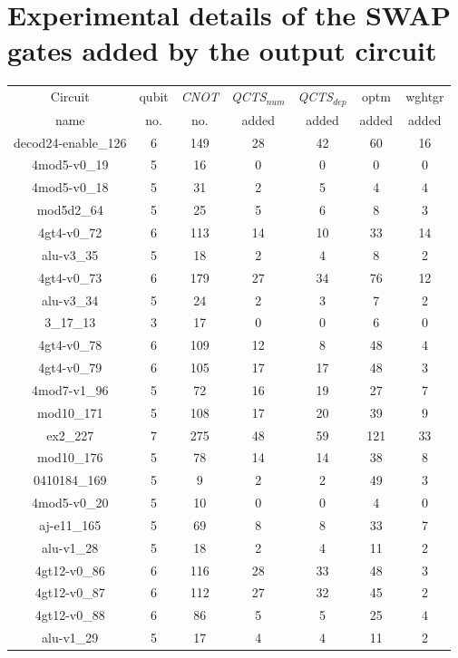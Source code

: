\documentclass[runningheads]{llncs}
\begin{document}
\section{Experimental details of the SWAP gates added by the output circuit}
\begin{table}[H]
	\begin{center}  
	\begin{tabular}{|c|c|c|c|c|c|c|}
	\hline
	Circuit &  qubit  & \textit{CNOT} &\textit{QCTS$_{num}$}& \textit{QCTS$_{dep}$}  & optm 	 & wghtgr 	\\
	 name	&   no. 	&	no. & added&  added &  added 	&  added\\
	\hline
	decod24-enable\_126 & 6 & 149 & 28 & 42 & 60 & 16 \\ 
4mod5-v0\_19 & 5 & 16 & 0 & 0 & 0 & 0 \\ 
4mod5-v0\_18 & 5 & 31 & 2 & 5 & 4 & 4 \\ 
mod5d2\_64 & 5 & 25 & 5 & 6 & 8 & 3 \\ 
4gt4-v0\_72 & 6 & 113 & 14 & 10 & 33 & 14 \\ 
alu-v3\_35 & 5 & 18 & 2 & 4 & 8 & 2 \\ 
4gt4-v0\_73 & 6 & 179 & 27 & 34 & 76 & 12 \\ 
alu-v3\_34 & 5 & 24 & 2 & 3 & 7 & 2 \\ 
3\_17\_13 & 3 & 17 & 0 & 0 & 6 & 0 \\ 
4gt4-v0\_78 & 6 & 109 & 12 & 8 & 48 & 4 \\ 
4gt4-v0\_79 & 6 & 105 & 17 & 17 & 48 & 3 \\ 
4mod7-v1\_96 & 5 & 72 & 16 & 19 & 27 & 7 \\ 
mod10\_171 & 5 & 108 & 17 & 20 & 39 & 9 \\ 
ex2\_227 & 7 & 275 & 48 & 59 & 121 & 33 \\ 
mod10\_176 & 5 & 78 & 14 & 14 & 38 & 8 \\ 
0410184\_169 & 5 & 9 & 2 & 2 & 49 & 3 \\ 
4mod5-v0\_20 & 5 & 10 & 0 & 0 & 4 & 0 \\ 
aj-e11\_165 & 5 & 69 & 8 & 8 & 33 & 7 \\ 
alu-v1\_28 & 5 & 18 & 2 & 4 & 11 & 2 \\ 
4gt12-v0\_86 & 6 & 116 & 28 & 33 & 48 & 3 \\ 
4gt12-v0\_87 & 6 & 112 & 27 & 32 & 45 & 2 \\ 
4gt12-v0\_88 & 6 & 86 & 5 & 5 & 25 & 4 \\ 
alu-v1\_29 & 5 & 17 & 4 & 4 & 11 & 2 \\ 

\end{tabular}
\end{center}
\end{table}
\end{document}
